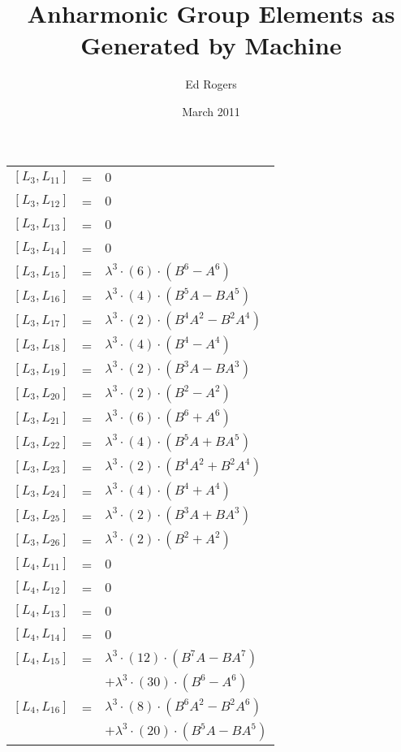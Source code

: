 \documentclass{article}
\title{Anharmonic Group Elements as Generated by Machine}
\author{Ed Rogers}
\date{March 2011}
\begin{document}
   \maketitle
\begin{center}
\begin{longtable}{lll}
$[L_{3},L_{11}]$ & = & $ 0 $ \\
$[L_{3},L_{12}]$ & = & $ 0 $ \\
$[L_{3},L_{13}]$ & = & $ 0 $ \\
$[L_{3},L_{14}]$ & = & $ 0 $ \\
$[L_{3},L_{15}]$ & = & ${\lambda}^3{\cdot}(6){\cdot}(B^{6}-A^{6})$ \\
$[L_{3},L_{16}]$ & = & ${\lambda}^3{\cdot}(4){\cdot}(B^{5}A-BA^{5})$ \\
$[L_{3},L_{17}]$ & = & ${\lambda}^3{\cdot}(2){\cdot}(B^{4}A^{2}-B^{2}A^{4})$ \\
$[L_{3},L_{18}]$ & = & ${\lambda}^3{\cdot}(4){\cdot}(B^{4}-A^{4})$ \\
$[L_{3},L_{19}]$ & = & ${\lambda}^3{\cdot}(2){\cdot}(B^{3}A-BA^{3})$ \\
$[L_{3},L_{20}]$ & = & ${\lambda}^3{\cdot}(2){\cdot}(B^{2}-A^{2})$ \\
$[L_{3},L_{21}]$ & = & ${\lambda}^3{\cdot}(6){\cdot}(B^{6}+A^{6})$ \\
$[L_{3},L_{22}]$ & = & ${\lambda}^3{\cdot}(4){\cdot}(B^{5}A+BA^{5})$ \\
$[L_{3},L_{23}]$ & = & ${\lambda}^3{\cdot}(2){\cdot}(B^{4}A^{2}+B^{2}A^{4})$ \\
$[L_{3},L_{24}]$ & = & ${\lambda}^3{\cdot}(4){\cdot}(B^{4}+A^{4})$ \\
$[L_{3},L_{25}]$ & = & ${\lambda}^3{\cdot}(2){\cdot}(B^{3}A+BA^{3})$ \\
$[L_{3},L_{26}]$ & = & ${\lambda}^3{\cdot}(2){\cdot}(B^{2}+A^{2})$ \\
$[L_{4},L_{11}]$ & = & $ 0 $ \\
$[L_{4},L_{12}]$ & = & $ 0 $ \\
$[L_{4},L_{13}]$ & = & $ 0 $ \\
$[L_{4},L_{14}]$ & = & $ 0 $ \\
$[L_{4},L_{15}]$ & = & ${\lambda}^3{\cdot}(12){\cdot}(B^{7}A-BA^{7})$ \\*
 & & $ + {\lambda}^3{\cdot}(30){\cdot}(B^{6}-A^{6})$ \\
$[L_{4},L_{16}]$ & = & ${\lambda}^3{\cdot}(8){\cdot}(B^{6}A^{2}-B^{2}A^{6})$ \\*
 & & $ + {\lambda}^3{\cdot}(20){\cdot}(B^{5}A-BA^{5})$ \\

\end{longtable}
\end{center}
\end{document}
